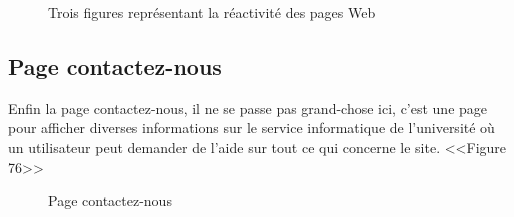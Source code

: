 \documentclass[12pt]{report}
\begin{document}
\begin{figure}[h]
\begin{minipage}{.33\textwidth}
\end{minipage}
  \caption{Trois figures représentant la réactivité des pages Web}
\end{figure}

\newpage

\subsection{Page contactez-nous}

Enfin la page contactez-nous, il ne se passe pas grand-chose ici, c'est une page pour afficher diverses informations sur le service informatique de l'université où un utilisateur peut demander de l'aide sur tout ce qui concerne le site. <<Figure 76>>

\vspace{0.3in}

\begin{figure}[h]
\centering
\caption{Page contactez-nous}
\end{figure}
\end{document}

